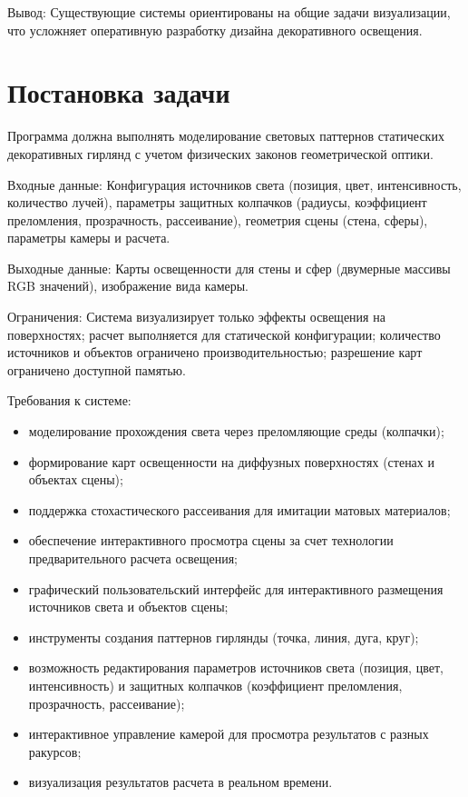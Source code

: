 Вывод: Существующие системы ориентированы на общие задачи визуализации, что усложняет оперативную разработку дизайна декоративного освещения. 

\section{Постановка задачи}

Программа должна выполнять моделирование световых паттернов статических декоративных гирлянд с учетом физических законов геометрической оптики.

Входные данные: Конфигурация источников света (позиция, цвет, интенсивность, количество лучей), параметры защитных колпачков (радиусы, коэффициент преломления, прозрачность, рассеивание), геометрия сцены (стена, сферы), параметры камеры и расчета.

Выходные данные: Карты освещенности для стены и сфер (двумерные массивы RGB значений), изображение вида камеры.

Ограничения: Система визуализирует только эффекты освещения на поверхностях; расчет выполняется для статической конфигурации; количество источников и объектов ограничено производительностью; разрешение карт ограничено доступной памятью.

Требования к системе:
\begin{itemize}
    \item моделирование прохождения света через преломляющие среды (колпачки);
    \item формирование карт освещенности на диффузных поверхностях (стенах и объектах сцены);
    \item поддержка стохастического рассеивания для имитации матовых материалов;
    \item обеспечение интерактивного просмотра сцены за счет технологии предварительного расчета освещения;
    \item графический пользовательский интерфейс для интерактивного размещения источников света и объектов сцены;
    \item инструменты создания паттернов гирлянды (точка, линия, дуга, круг);
    \item возможность редактирования параметров источников света (позиция, цвет, интенсивность) и защитных колпачков (коэффициент преломления, прозрачность, рассеивание);
    \item интерактивное управление камерой для просмотра результатов с разных ракурсов;
    \item визуализация результатов расчета в реальном времени.
\end{itemize}

